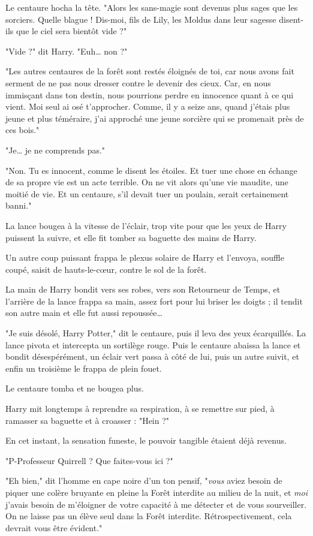Le centaure hocha la tête. "Alors les sans-magie sont devenus plus sages que les sorciers. Quelle blague ! Dis-moi, fils de Lily, les Moldus dans leur sagesse disent-ils que le ciel sera bientôt vide ?"

"Vide ?" dit Harry. "Euh… non ?"

"Les autres centaures de la forêt sont restés éloignés de toi, car nous avons fait serment de ne pas nous dresser contre le devenir des cieux. Car, en nous immisçant dans ton destin, nous pourrions perdre en innocence quant à ce qui vient. Moi seul ai osé t'approcher. Comme, il y a seize ans, quand j'étais plus jeune et plus téméraire, j'ai approché une jeune sorcière qui se promenait près de ces bois."

"Je… je ne comprends pas."

"Non. Tu es innocent, comme le disent les étoiles. Et tuer une chose en échange de sa propre vie est un acte terrible. On ne vit alors qu'une vie maudite, une moitié de vie. Et un centaure, s'il devait tuer un poulain, serait certainement banni."

La lance bougea à la vitesse de l'éclair, trop vite pour que les yeux de Harry puissent la suivre, et elle fit tomber sa baguette des mains de Harry.

Un autre coup puissant frappa le plexus solaire de Harry et l'envoya, souffle coupé, saisit de hauts-le-cœur, contre le sol de la forêt.

La main de Harry bondit vers ses robes, vers son Retourneur de Temps, et l'arrière de la lance frappa sa main, assez fort pour lui briser les doigts ; il tendit son autre main et elle fut aussi repoussée…

"Je suis désolé, Harry Potter," dit le centaure, puis il leva des yeux écarquillés. La lance pivota et intercepta un sortilège rouge. Puis le centaure abaissa la lance et bondit désespérément, un éclair vert passa à côté de lui, puis un autre suivit, et enfin un troisième le frappa de plein fouet.

Le centaure tomba et ne bougea plus.

Harry mit longtemps à reprendre sa respiration, à se remettre sur pied, à ramasser sa baguette et à croasser : "Hein ?"

En cet instant, la sensation funeste, le pouvoir tangible étaient déjà revenus.

"P-Professeur Quirrell ? Que faites-vous ici ?"

"Eh bien," dit l'homme en cape noire d'un ton pensif, "\emph{vous}  aviez besoin de piquer une colère bruyante en pleine la Forêt interdite au milieu de la nuit, et \emph{moi}  j'avais besoin de m'éloigner de votre capacité à me détecter et de vous sourveiller. On ne laisse pas un élève seul dans la Forêt interdite. Rétrospectivement, cela devrait vous être évident."

